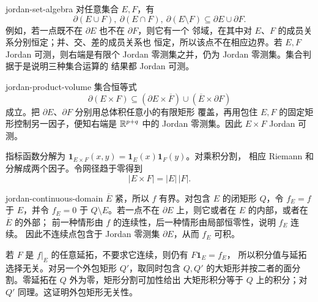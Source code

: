 \begin{solution}{jordan-set-algebra}
对任意集合 \(E,F\)，有
\[
 \partial(E\cup F),\ \partial(E\cap F),\ \partial(E\setminus F)
 \subseteq\partial E\cup\partial F.
\]
例如，若一点既不在 \(\partial E\) 也不在 \(\partial F\)，则它有一个
邻域，在其中对 \(E\)、\(F\) 的成员关系分别恒定；并、交、差的成员关系也
恒定，所以该点不在相应边界。若 \(E,F\) Jordan 可测，则右端是有限个
Jordan 零测集之并，仍为 Jordan 零测集。集合判据于是说明三种集合运算的
结果都 Jordan 可测。
\end{solution}

\begin{solution}{jordan-product-volume}
集合恒等式
\[
 \partial(E\times F)
 \subseteq(\partial E\times\overline F)
       \cup(\overline E\times\partial F)
\]
成立。把 \(\partial E\)、\(\partial F\) 分别用总体积任意小的有限矩形
覆盖，再用包住 \(E,F\) 的固定矩形控制另一因子，便知右端是
\(\mathbb{R}^{p+q}\) 中的 Jordan 零测集。因此 \(E\times F\) Jordan 可测。

指标函数分解为
\(\mathbf1_{E\times F}(x,y)=\mathbf1_E(x)\mathbf1_F(y)\)。对乘积分割，
相应 Riemann 和分解成两个因子。令网径趋于零得到
\[
 |E\times F|=|E|\,|F|.
\]
\end{solution}

\begin{solution}{jordan-continuous-domain}
$\overline E$ 紧，所以 $f$ 有界。对包含 $E$ 的闭矩形 $Q$，令
$f_E=f$ 于 $E$，并令 $f_E=0$ 于 $Q\setminus E$。若一点不在
$\partial E$ 上，则它或者在 $E$ 的内部，或者在 $\overline E$ 的外部；
前一种情形由 $f$ 的连续性，后一种情形由局部恒零性，说明 $f_E$ 连续。
因此不连续点包含于 Jordan 零测集 $\partial E$，从而 $f_E$ 可积。

若 $F$ 是 $f|_E$ 的任意延拓，不要求它连续，则仍有 $F\mathbf1_E=f_E$，
所以积分值与延拓选择无关。对另一个外包矩形 $Q'$，取同时包含 $Q,Q'$
的大矩形并按二者的面分割。零延拓在 $Q$ 外为零，矩形分割可加性给出
大矩形积分等于 $Q$ 上的积分；对 $Q'$ 同理。这证明外包矩形无关性。
\end{solution}
